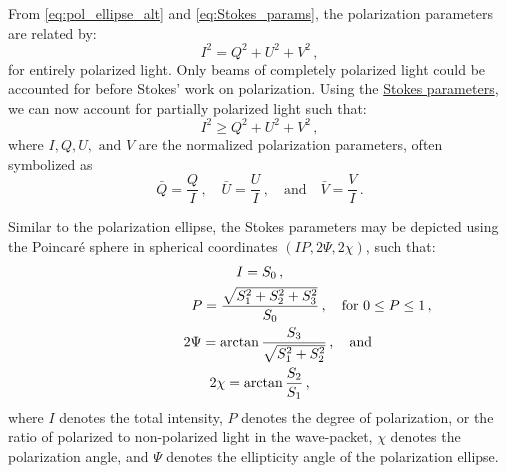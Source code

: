 
From \autoref{eq:pol_ellipse_alt} and \ref{eq:Stokes_params}, the polarization parameters are related by:
\begin{equation}
    {I}^{2} = {Q}^{2} + {U}^{2} + {V}^{2}\,,
\end{equation}
for entirely polarized light. Only beams of completely polarized light could be accounted for before Stokes' work on polarization. Using the \hyperref[eq:Stokes_params]{Stokes parameters}, we can now account for partially polarized light such that:
\begin{equation}
    I^{2} \geq  Q^{2} + U^{2} + V^{2}\,,
\end{equation}
where $I, Q, U, \text{ and } V$ are the normalized polarization parameters, often symbolized as
\begin{equation}
    \bar{Q} = \frac{Q}{I}\,,\quad \bar{U} = \frac{U}{I}\,,\quad \text{and}\quad \bar{V} = \frac{V}{I}\,.\label{eq:Stokes_norm}
\end{equation}

Similar to the polarization ellipse, the Stokes parameters may be depicted using the Poincar{\'e} sphere in spherical coordinates $(IP, 2 \Psi, 2 \chi)$, such that:
\begin{equation}
    \begin{gathered}
        I = S_{0}\,,\\
        P = \frac{\sqrt{S_{1}^2 + S_{2}^2 + S_{3}^2}}{S_{0}}\,,\rlap{\quad for $0 \leq P \leq 1$\,,}\\
        2 \Psi = \arctan \frac{S_{3}}{\sqrt{S_{1}^{2} + S_{2}^{2}}}\,,\rlap{\quad and}\\
        2 \chi = \arctan \frac{S_{2}}{S_{1}}\,,
    \end{gathered}\label{eq:poincare_coords}
\end{equation}
where $I$ denotes the total intensity, $P$ denotes the degree of polarization, or the ratio of polarized to non-polarized light in the wave-packet, $\chi$ denotes the polarization angle, and $\Psi$ denotes the ellipticity angle of the polarization ellipse.

